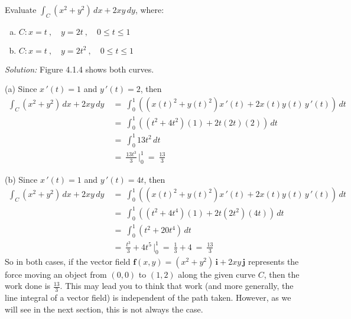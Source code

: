 \vspace{3mm}
\begin{exa}\label{exa:lineintexa}
 Evaluate $\int_C (x^2 + y^2 )\,dx + 2xy\,dy$, where:
 \begin{enumerate}[(a)]
  \item $C: x=t~,\quad y=2t~,\quad 0 \le t \le 1$
  \item $C: x=t~,\quad y=2t^2 ~,\quad 0 \le t \le 1$
 \end{enumerate}

 \piccaption[]{}
 \par\noindent \emph{Solution:} Figure 4.1.4 shows both curves.\vspace{1mm}
 \par\noindent (a) Since $x\,'(t)=1$ and $y\,'(t)=2$, then
 \begin{align*}
  \int_C (x^2 + y^2 )\,dx + 2xy\,dy ~&=~
   \int_0^1 \left( ( x(t)^2 + y(t)^2 )x\,'(t) + 2x(t)y(t)\,y\,'(t) \right) \,dt\\
   &=~ \int_0^1 \left( (t^2 + 4t^2 )(1) + 2t(2t)(2) \right) \,dt\\
   &=~ \int_0^1 13t^2 \,dt\\
   &=~ \frac{13t^3}{3}\,\Bigg|_0^1 ~=~ \frac{13}{3}
 \end{align*}

 \par\noindent (b) Since $x\,'(t)=1$ and $y\,'(t)=4t$, then
 \begin{align*}
  \int_C (x^2 + y^2 )\,dx + 2xy\,dy ~&=~
   \int_0^1 \left( ( x(t)^2 + y(t)^2 )x\,'(t) + 2x(t)y(t)\,y\,'(t) \right) \,dt\\
   &=~ \int_0^1 \left( (t^2 + 4t^4 )(1) + 2t(2t^2 )(4t) \right) \,dt\\
   &=~ \int_0^1 (t^2 + 20t^4 )\,dt\\
   &=~ \frac{t^3}{3} + 4t^5 \,\Bigg|_0^1 ~=~ \frac{1}{3} + 4 ~=~ \frac{13}{3}
 \end{align*}
 So in both cases, if the vector field $\textbf{f}(x,y) = ( x^2 + y^2 )\,\textbf{i} +
 2xy\,\textbf{j}$ represents the force moving an object from $(0,0)$ to $(1,2)$ along the given curve $C$, then the
 work done is $\frac{13}{3}$. This may lead you to think that work (and more generally, the line integral of a vector
 field) is independent of the path taken. However, as we will see in the next section, this is not always the
 case.
\end{exa}
